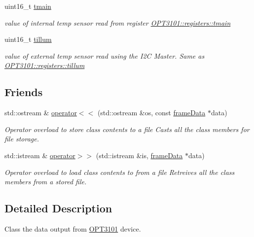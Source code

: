 \begin{DoxyCompactItemize}
uint16\+\_\+t \mbox{\hyperlink{class_o_p_t3101_1_1frame_data_ae75ca7e9fa494b4d711eb070d5cab45b}{tmain}}
\begin{DoxyCompactList}\small\item\em value of internal temp sensor read from register \mbox{\hyperlink{class_o_p_t3101_1_1registers_a3dfd8d81d4cb04d274007deb7c6122fc}{O\+P\+T3101\+::registers\+::tmain}} \end{DoxyCompactList}\item 
uint16\+\_\+t \mbox{\hyperlink{class_o_p_t3101_1_1frame_data_aeb1934ab0ac8d1f846cf166ef26ceb75}{tillum}}
\begin{DoxyCompactList}\small\item\em value of external temp sensor read using the I2C Master. Same as \mbox{\hyperlink{class_o_p_t3101_1_1registers_a8a097a41ecdf2b98226c4a3a92121c12}{O\+P\+T3101\+::registers\+::tillum}} \end{DoxyCompactList}\end{DoxyCompactItemize}
\subsection*{Friends}
\begin{DoxyCompactItemize}
\item 
std\+::ostream \& \mbox{\hyperlink{class_o_p_t3101_1_1frame_data_a01b42d736d5c28f4061d11fea440e237}{operator$<$$<$}} (std\+::ostream \&os, const \mbox{\hyperlink{class_o_p_t3101_1_1frame_data}{frame\+Data}} $\ast$data)
\begin{DoxyCompactList}\small\item\em Operator overload to store class contents to a file Casts all the class members for file storage. \end{DoxyCompactList}\item 
std\+::istream \& \mbox{\hyperlink{class_o_p_t3101_1_1frame_data_a1e4d3c11fc552ec13eb14e06164bfad6}{operator$>$$>$}} (std\+::istream \&is, \mbox{\hyperlink{class_o_p_t3101_1_1frame_data}{frame\+Data}} $\ast$data)
\begin{DoxyCompactList}\small\item\em Operator overload to load class contents to from a file Retreives all the class members from a stored file. \end{DoxyCompactList}\end{DoxyCompactItemize}


\subsection{Detailed Description}
Class the data output from \mbox{\hyperlink{namespace_o_p_t3101}{O\+P\+T3101}} device. 

